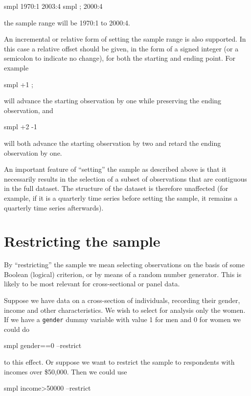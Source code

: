 \begin{code}
smpl 1970:1 2003:4
smpl ; 2000:4
\end{code}

the sample range will be 1970:1 to 2000:4.  

An incremental or relative form of setting the sample range is also
supported.  In this case a relative offset should be given, in the
form of a signed integer (or a semicolon to indicate no change), for
both the starting and ending point. For example

\begin{code}
smpl +1 ;
\end{code}

will advance the starting observation by one while preserving the
ending observation, and

\begin{code}
smpl +2 -1
\end{code}

will both advance the starting observation by two and retard the
ending observation by one.

An important feature of ``setting'' the sample as described above is
that it necessarily results in the selection of a subset of
observations that are contiguous in the full dataset. The structure of
the dataset is therefore unaffected (for example, if it is a quarterly
time series before setting the sample, it remains a quarterly time
series afterwards).

\section{Restricting the sample}
\label{sec:sample-restrict}

By ``restricting'' the sample we mean selecting observations on the
basis of some Boolean (logical) criterion, or by means of a random
number generator.  This is likely to be most relevant for
cross-sectional or panel data.

Suppose we have data on a cross-section of individuals, recording
their gender, income and other characteristics.  We wish to select for
analysis only the women.  If we have a \verb+gender+ dummy variable
with value 1 for men and 0 for women we could do
%      
\begin{code}
smpl gender==0 --restrict
\end{code}
%
to this effect.  Or suppose we want to restrict the sample to
respondents with incomes over \$50,000.  Then we could use
%
\begin{code}
smpl income>50000 --restrict
\end{code}


